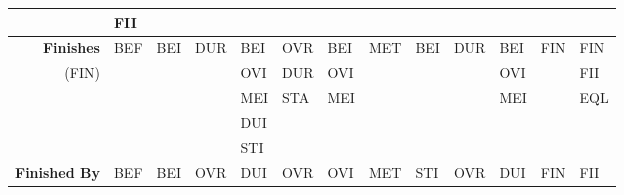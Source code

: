 \documentclass[11pt]{report}
\newenvironment{vvarmargin}[2]
{
  \begin{list}{}
  {
    \setlength{\topsep}{0pt}
    \setlength{\leftmargin}{0pt}
    \setlength{\rightmargin}{0pt}
    \setlength{\listparindent}{\parindent}
    \setlength{\itemindent}{\parindent}
    \setlength{\parsep}{0pt plus 1pt}
    \addtolength{\leftmargin}{#1}\addtolength{\rightmargin}{#2}
  }
  \item
}
{
  \end{list}
}
\begin{document}
\begin{table}[p]
\begin{vvarmargin}{-4cm}{-4cm}
\begin{center}
\begin{tabular}[t]{|r|l|l|l|l|l|l|l|l|l|l|l|l|}
                                          & FII                     &                         &                         &                         &                         &                         &                         &                         &                         &                         &                         &                         \\
                  \hline
                  \textbf{Finishes}       & BEF                     & BEI                     & DUR                     & BEI                     & OVR                     & BEI                     & MET                     & BEI                     & DUR                     & BEI                     & FIN                     & FIN                     \\
                  (FIN)                   &                         &                         &                         & OVI                     & DUR                     & OVI                     &                         &                         &                         & OVI                     &                         & FII                     \\
                                          &                         &                         &                         & MEI                     & STA                     & MEI                     &                         &                         &                         & MEI                     &                         & EQL                     \\
                                          &                         &                         &                         & DUI                     &                         &                         &                         &                         &                         &                         &                         &                         \\
                                          &                         &                         &                         & STI                     &                         &                         &                         &                         &                         &                         &                         &                         \\
                  \hline
                  \textbf{Finished By}    & BEF                     & BEI                     & OVR                     & DUI                     & OVR                     & OVI                     & MET                     & STI                     & OVR                     & DUI                     & FIN                     & FII                     \\

\end{tabular}
\end{center}
\end{vvarmargin}
\end{table}
\end{document}
